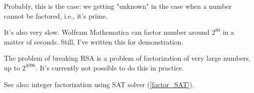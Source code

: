Probably, this is the case: we getting "unknown" in the case when a number cannot be factored, i.e., it's prime.

It's also very slow. Wolfram Mathematica can factor number around $2^{80}$ in a matter of seconds.
Still, I've written this for demonstration.

The problem of breaking \ac{RSA} is a problem of factorization of very large numbers, up to $2^{4096}$.
It's currently not possible to do this in practice.

See also: integer factorization using SAT solver (\ref{factor_SAT}).

